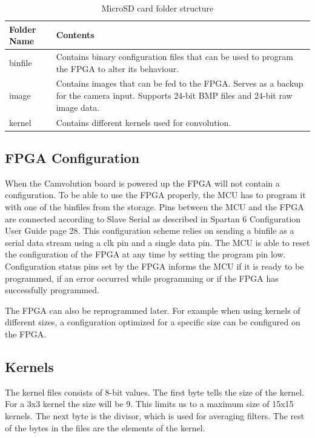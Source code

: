 \begin{table}[h!]
\centering
	\begin{tabular}{ | l | p{10cm} |}
		\hline
		Folder Name & Contents \\ \hline
		binfile & Contains binary configuration files that can be used to program the FPGA to alter its behaviour. \\ \hline
		image & Contains images that can be fed to the FPGA. Serves as a backup for the camera input. Supports 24-bit BMP files and 24-bit raw image data. \\ \hline
		kernel & Contains different kernels used for convolution. \\ \hline
	\end{tabular}
	\caption{MicroSD card folder structure}
	\label{microsd_folder}
\end{table}


\subsection{FPGA Configuration}
When the Camvolution board is powered up the FPGA will not contain a configuration. To be able to use the FPGA properly, the MCU has to program it with one of the binfiles from the storage. Pins between the MCU and the FPGA are connected according to Slave Serial as described in Spartan 6 Configuration User Guide\cite{ug380} page 28. This configuration scheme relies on sending a binfile as a serial data stream using a clk pin and a single data pin. The MCU is able to reset the configuration of the FPGA at any time by setting the program pin low. Configuration status pins set by the FPGA informs the MCU if it is ready to be programmed, if an error occurred while programming or if the FPGA has successfully programmed. 

The FPGA can also be reprogrammed later. For example when using kernels of different sizes, a configuration optimized for a specific size can be configured on the FPGA.


\subsection{Kernels}
The kernel files consists of 8-bit values. The first byte tells the size of the kernel. For a 3x3 kernel the size will be 9. This limits us to a maximum size of 15x15 kernels. The next byte is the divisor, which is used for averaging filters. The rest of the bytes in the files are the elements of the kernel.


